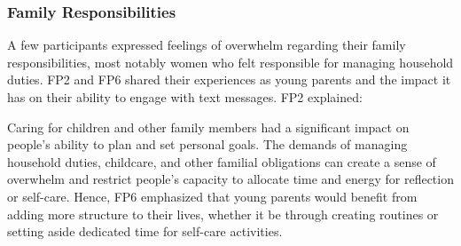 \subsubsection{Family Responsibilities}
A few participants expressed feelings of overwhelm regarding their family responsibilities, most notably women who felt responsible for managing household duties. FP2 and FP6 shared their experiences as young parents and the impact it has on their ability to engage with text messages. FP2 explained:


\noindent
Caring for children and other family members had a significant impact on people's ability to plan and set personal goals. The demands of managing household duties, childcare, and other familial obligations can create a sense of overwhelm and restrict people's capacity to allocate time and energy for reflection or self-care. Hence, FP6 emphasized that young parents would benefit from adding more structure to their lives, whether it be through creating routines or setting aside dedicated time for self-care activities. 


